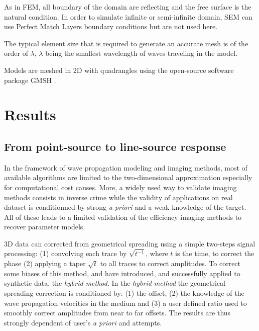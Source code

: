 \documentclass[manuscript,revised]{geophysics}
\newcommand{\twod}{two-dimensional }
\begin{document}
\noindent As in FEM, all boundary of the domain are reflecting and the free surface is the natural condition.  In order to simulate infinite or semi-infinite domain, SEM can use Perfect Match Layers boundary conditions \citep{Berenger_PML_1994,Festa_PML_2005} but are not used here.
 
\noindent The typical element size that is required to generate an accurate mesh is of the order of $\lambda$, $\lambda$ being the smallest wavelength of waves traveling in the model.

\noindent Models are meshed in 2D with quadrangles using the open-source software package GMSH \citep{Geuzaine_MSH_2009}. 

\section{Results}

\subsection{From point-source to line-source response}

\noindent In the framework of wave propagation modeling and imaging methods, most of available algorithms are limited to the \twod approximation especially for computational cost causes. More, a widely used way to validate imaging methods consists in inverse crime while the validity of applications on real dataset is conditionned by strong \textit{a priori} and a weak knowledge of the target. All of these leads to a limited validation of the efficiency imaging methods to recover parameter models.

\noindent 3D data can corrected from geometrical spreading using a simple two-steps signal processing: (1) convolving each trace by $\sqrt{t^{-1}}$, where $t$ is the time, to correct the phase (2) applying a taper $\sqrt{t}$ to all traces to correct amplitudes. To correct some biases of this method, \citet{Forbriger_LSS_2014} and \citet{Schafer_LSS_2014} have introduced, and successfully applied to synthetic data, the \textit{hybrid method}. In the \textit{hybrid method} the geometrical spreading correction is conditioned by: (1) the offset, (2) the knowledge of the wave propagation velocities in the medium and (3) a user defined ratio used to smoothly correct amplitudes from near to far offsets. The results are thus strongly dependent of user's \textit{a priori} and attempts.   
\end{document}
